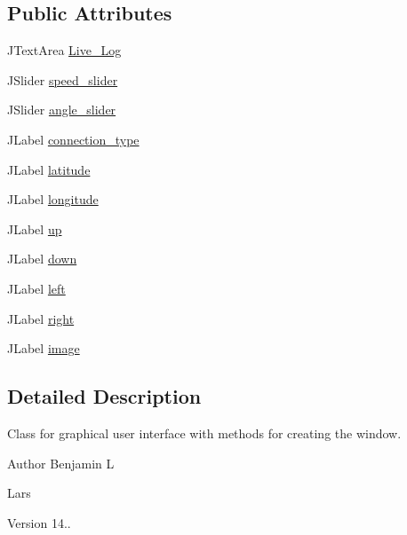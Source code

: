 \subsection*{Public Attributes}
\begin{DoxyCompactItemize}
\item 
J\+Text\+Area \hyperlink{class_view_1_1_g_u_i___computer_a17e310e9b0265274f5218abc40363635}{Live\+\_\+\+Log}
\item 
J\+Slider \hyperlink{class_view_1_1_g_u_i___computer_af9fb9995bca970a583e0a9f56f0dd353}{speed\+\_\+slider}
\item 
J\+Slider \hyperlink{class_view_1_1_g_u_i___computer_a7be0cc3ba13b440455a9d932bed00ef6}{angle\+\_\+slider}
\item 
J\+Label \hyperlink{class_view_1_1_g_u_i___computer_a05009f1450ebbca59fae2677c9a58dbc}{connection\+\_\+type}
\item 
J\+Label \hyperlink{class_view_1_1_g_u_i___computer_a9164100c943dbfc42797f9afa95507fe}{latitude}
\item 
J\+Label \hyperlink{class_view_1_1_g_u_i___computer_afd969a98ae0119003943e3ccb2ce02df}{longitude}
\item 
J\+Label \hyperlink{class_view_1_1_g_u_i___computer_aee5114c982485cd981782c44c18d7b3a}{up}
\item 
J\+Label \hyperlink{class_view_1_1_g_u_i___computer_ac34a6225153e8d116561defa2fe9b5e4}{down}
\item 
J\+Label \hyperlink{class_view_1_1_g_u_i___computer_a721b085f5839422479fadf1e29e3f7be}{left}
\item 
J\+Label \hyperlink{class_view_1_1_g_u_i___computer_a19428a54eca1c7b361fc8f92b585f110}{right}
\item 
J\+Label \hyperlink{class_view_1_1_g_u_i___computer_ad48645e760f1799c7e1fd4022ffa345d}{image}
\end{DoxyCompactItemize}


\subsection{Detailed Description}
Class for graphical user interface with methods for creating the window.

\begin{DoxyAuthor}{Author}
Benjamin L 

Lars 
\end{DoxyAuthor}
\begin{DoxyVersion}{Version}
14.. 
\end{DoxyVersion}


